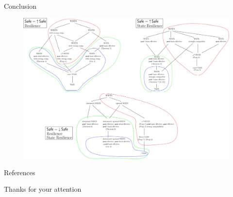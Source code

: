 \documentclass{beamer}
\newcommand{\Bad}{\textsf{Bad}}
\newcommand{\Safe}{\textsf{Safe}}
\begin{document}
  \begin{frame}{Conclusion}
  
   \begin{center}
 	\begin{figure}
 	\vspace{-0.25cm}
\includegraphics[width=1.00\textwidth]{All_results}
	\end{figure}
\end{center}  
    



  \end{frame}
  \begin{frame}{References}
      
      {\tiny

}

  \end{frame}
  \begin{frame}
  
  \begin{center}
  Thanks for your attention
  \end{center}
  


  \end{frame}

 
  
\end{document}
